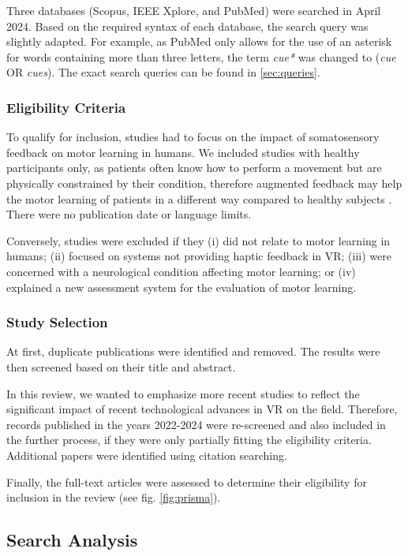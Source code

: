 Three databases (Scopus, IEEE Xplore, and PubMed) were searched in April 2024. Based on the required syntax of each database, the search query was slightly adapted. For example, as PubMed only allows for the use of an asterisk for words containing more than three letters, the term \textit{cue*} was changed to (\textit{cue} OR \textit{cues}). The exact search queries can be found in \ref{sec:queries}. 

\subsubsection{Eligibility Criteria}
\label{sec:eligibility}
To qualify for inclusion, studies had to focus on the impact of somatosensory feedback on motor learning in humans. We included studies with healthy participants only, as patients often know how to perform a movement but are physically constrained by their condition, therefore augmented feedback may help the motor learning of patients in a different way compared to healthy subjects \cite{Sigrist2013AugmentedReview}. There were no publication date or language limits.

Conversely, studies were excluded if they (i) did not relate to motor learning in humans; (ii) focused on systems not providing haptic feedback in VR; (iii) were concerned with a neurological condition affecting motor learning; or (iv) explained a new assessment system for the evaluation of motor learning.

\subsubsection{Study Selection}
At first, duplicate publications were identified and removed. The results were then screened based on their title and abstract. 

In this review, we wanted to emphasize more recent studies to reflect the significant impact of recent technological advances in VR on the field. Therefore, records published in the years 2022-2024 were re-screened and also included in the further process, if they were only partially fitting the eligibility criteria. Additional papers were identified using citation searching.

Finally, the full-text articles were assessed to determine their eligibility for inclusion in the review (see fig. \ref{fig:prisma}).


\subsection{Search Analysis}
